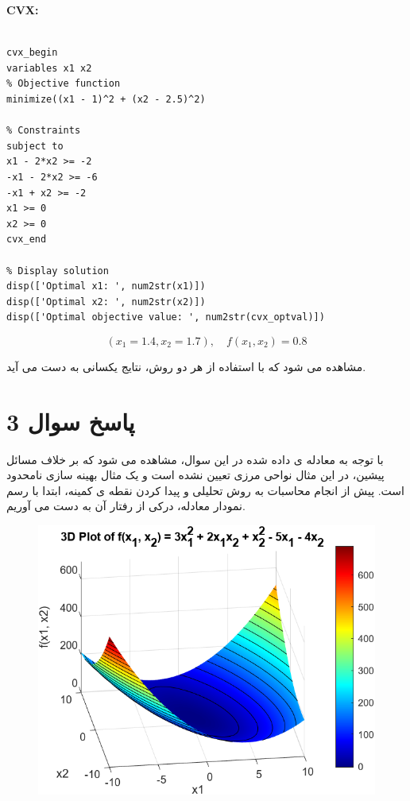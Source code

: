 \textbf{CVX:}

\begin{latin}
	\begin{lstlisting}[frame=single,style=Matlab-Pyglike]
		
cvx_begin
variables x1 x2
% Objective function
minimize((x1 - 1)^2 + (x2 - 2.5)^2)

% Constraints
subject to
x1 - 2*x2 >= -2
-x1 - 2*x2 >= -6
-x1 + x2 >= -2
x1 >= 0
x2 >= 0
cvx_end

% Display solution
disp(['Optimal x1: ', num2str(x1)])
disp(['Optimal x2: ', num2str(x2)])
disp(['Optimal objective value: ', num2str(cvx_optval)])
	\end{lstlisting}
\end{latin}

\[
(x_1 = 1.4, x_2 = 1.7) , \quad f(x_1, x_2) = 0.8
\]

مشاهده می شود که با استفاده از هر دو روش، نتایج یکسانی به دست می آید.

\section{پاسخ سوال 3}

با توجه به معادله ی داده شده در این سوال، مشاهده می شود که بر خلاف مسائل پیشین، در این مثال نواحی مرزی تعیین نشده است و یک مثال بهینه سازی نامحدود است. پیش از انجام محاسبات به روش تحلیلی و پیدا کردن نقطه ی کمینه، ابتدا با رسم نمودار معادله، درکی از رفتار آن به دست می آوریم.



\begin{figure}[H]
	\centering
	\includegraphics[width=1\linewidth]{../img/Q3_1}
	\caption{}
	\label{fig:q31}
\end{figure}

